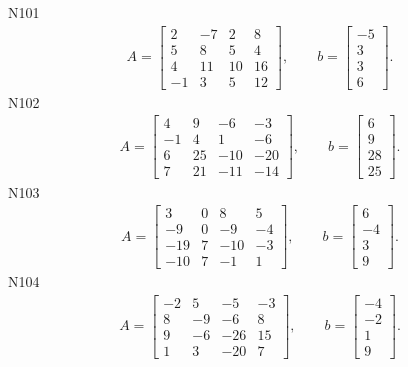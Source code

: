 \documentclass[11pt]{report}
\begin{document}
N101
\begin{align*}
 A = \left[\begin{matrix}2 & -7 & 2 & 8\\5 & 8 & 5 & 4\\4 & 11 & 10 & 16\\-1 & 3 & 5 & 12\end{matrix}\right],
\qquad b = \left[\begin{matrix}-5\\3\\3\\6\end{matrix}\right]. 
 \end{align*}
N102
\begin{align*}
 A = \left[\begin{matrix}4 & 9 & -6 & -3\\-1 & 4 & 1 & -6\\6 & 25 & -10 & -20\\7 & 21 & -11 & -14\end{matrix}\right],
\qquad b = \left[\begin{matrix}6\\9\\28\\25\end{matrix}\right]. 
 \end{align*}
N103
\begin{align*}
 A = \left[\begin{matrix}3 & 0 & 8 & 5\\-9 & 0 & -9 & -4\\-19 & 7 & -10 & -3\\-10 & 7 & -1 & 1\end{matrix}\right],
\qquad b = \left[\begin{matrix}6\\-4\\3\\9\end{matrix}\right]. 
 \end{align*}
N104
\begin{align*}
 A = \left[\begin{matrix}-2 & 5 & -5 & -3\\8 & -9 & -6 & 8\\9 & -6 & -26 & 15\\1 & 3 & -20 & 7\end{matrix}\right],
\qquad b = \left[\begin{matrix}-4\\-2\\1\\9\end{matrix}\right]. 
 \end{align*}
\end{document}
